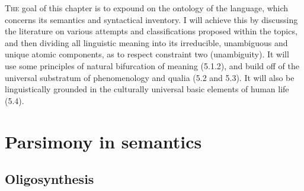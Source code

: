 
\lettrine{T}{he} goal of this chapter is to expound  on the ontology of the language, which concerns its semantics and syntactical inventory. I will achieve this by discussing the literature on various attempts and classifications proposed within the topics, and then dividing all linguistic meaning into its irreducible, unambiguous and unique atomic components, as to respect constraint two (unambiguity). It will use some principles of natural bifurcation of meaning (5.1.2), and build off of the universal substratum of phenomenology and qualia (5.2 and 5.3). It will also be linguistically grounded in the culturally universal basic elements of human life (5.4).


\section{Parsimony in semantics}

\subsection{Oligosynthesis}


